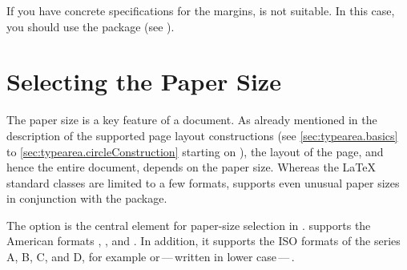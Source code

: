 \iftrue%
  If you have concrete specifications for the margins,  is
  not suitable. In this case, you should use the
   package (see \cite{package:geometry}).%
\fi%
\iffalse%
  The \Package{typearea} package is not designed to set up predefined margins.
  If you have to do so, the \Package{geometry}\IndexPackage{geometry} package
  (see \cite{package:geometry}) is recommended.%
\fi


\section{Selecting the Paper Size}
%
\BeginIndexGroup

The paper size is a key feature of a document. As already mentioned in the
description of the supported page layout constructions (see
\autoref{sec:typearea.basics} to \autoref{sec:typearea.circleConstruction}
starting on ), the layout of the page, and
hence the entire document, depends on the paper size. Whereas the {\LaTeX}
standard classes are limited to a few formats, {\KOMAScript} supports even
unusual paper sizes in conjunction with the  package.


\begin{Declaration}
\end{Declaration}%
The  option is the central
element for paper-size selection %
in \KOMAScript.  supports the American formats ,
, and . In addition, it supports the ISO
formats of the series A, B, C, and D, for example  or\,---\,written
in lower case\,---\,.

